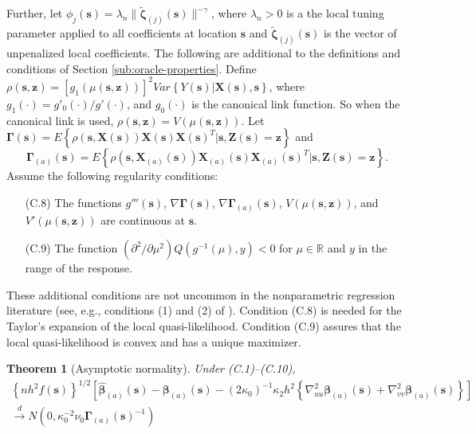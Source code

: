 \documentclass[authoryear,review, 12pt]{elsarticle}
\newtheorem{thm}{Theorem}
\begin{document}
Further, let $\phi_{j}(\bm{s})=\lambda_{n}\|\tilde{\bm{\zeta}}_{(j)}(\bm{s})\|^{-\gamma}$,
where $\lambda_{n}>0$ is a the local tuning parameter applied to
all coefficients at location $\bm{s}$ and $\tilde{\bm{\zeta}}_{(j)}(\bm{s})$
is the vector of unpenalized local coefficients. The following are
additional to the definitions and conditions of Section \ref{sub:oracle-properties}.
Define $\rho(\bm{s},\bm{z})=\left[g_{1}\left(\mu(\bm{s},\bm{z})\right)\right]^{2}Var\left\{ Y(\bm{s})|\bm{X}(\bm{s}),\bm{s}\right\} $,
where $g_{1}(\cdot)=g'_{0}(\cdot)/g'(\cdot)$, and $g_{0}(\cdot)$
is the canonical link function. So when the canonical link is used,
$\rho(\bm{s},\bm{z})=V\left(\mu(\bm{s},\bm{z})\right)$. Let $\bm{\Gamma}\left(\bm{s}\right)=E\left\{ \rho\left(\bm{s},\bm{X}(\bm{s})\right)\bm{X}(\bm{s})\bm{X}(\bm{s})^{T}|\bm{s},\bm{Z}(\bm{s})=\bm{z}\right\} $
and 
\[
\bm{\Gamma}_{(a)}\left(\bm{s}\right)=E\left\{ \rho\left(\bm{s},\bm{X}_{(a)}(\bm{s})\right)\bm{X}_{(a)}(\bm{s})\bm{X}_{(a)}(\bm{s})^{T}|\bm{s},\bm{Z}(\bm{s})=\bm{z}\right\} .
\]
Assume the following regularity conditions:
\begin{itemize}
\item[(C.8)] The functions $g'''\left(\bm{s}\right)$, $\nabla\bm{\Gamma}\left(\bm{s}\right)$,
$\nabla\bm{\Gamma}_{(a)}\left(\bm{s}\right)$, $V\left(\mu\left(\bm{s},\bm{z}\right)\right)$,
and $V'\left(\mu\left(\bm{s},\bm{z}\right)\right)$ are continuous
at $\bm{s}$.
\item[(C.9)] The function $\left(\partial^{2}/\partial\mu^{2}\right)Q\left(g^{-1}\left(\mu\right),y\right)<0$
for $\mu\in\mathbb{R}$ and $y$ in the range of the response.
\end{itemize}
These additional conditions are not uncommon in the nonparametric
regression literature (see, e.g., conditions (1) and (2) of \citet{Cai-Fan-Li-2000}).
Condition (C.8) is needed for the Taylor's expansion of the local
quasi-likelihood. Condition (C.9) assures that the local quasi-likelihood
is convex and has a unique maximizer.
\begin{thm}[Asymptotic normality]
\label{theorem:normality-glm}  Under (C.1)--(C.10),
\begin{gather*}
\left\{ nh^{2}f(\bm{s})\right\} ^{1/2}\left[\hat{\bm{\beta}}_{(a)}(\bm{s})-\bm{\beta}_{(a)}(\bm{s})-\left(2\kappa_{0}\right)^{-1}\kappa_{2}h^{2}\left\{ \nabla_{uu}^{2}\bm{\beta}_{\left(a\right)}(\bm{s})+\nabla_{vv}^{2}\bm{\beta}_{\left(a\right)}(\bm{s})\right\} \right]\\
\xrightarrow{d}N\left(0,\kappa_{0}^{-2}\nu_{0}\bm{\Gamma}_{(a)}(\bm{s})^{-1}\right)
\end{gather*}
\end{thm}
\end{document}
